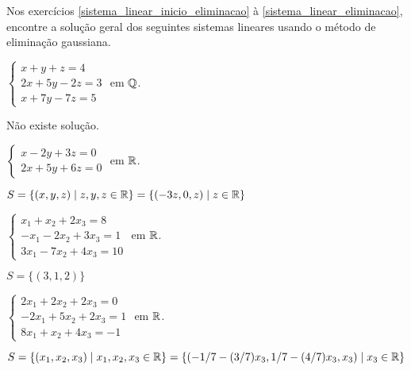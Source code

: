 \documentclass[12pt]{exam}
\begin{document}
Nos exercícios \ref{sistema_linear_inicio_eliminacao} à \ref{sistema_linear_eliminacao}, encontre a solução geral dos seguintes sistemas lineares usando o método de eliminação gaussiana.
\begin{exercicio}\label{sistema_linear_inicio_eliminacao}
    $
        \begin{cases}
            x + y + z = 4\\
            2x + 5y - 2z = 3\\
            x + 7y - 7z = 5
        \end{cases}
    $
    em $\mathbb{Q}$.
  \begin{solucao}
    Não existe solução.
  \end{solucao}
\end{exercicio}

\begin{exercicio}
    $
        \begin{cases}
            x - 2y + 3z = 0\\
            2x + 5y + 6z = 0
        \end{cases}
      $
      em $\mathbb{R}$.
    \begin{solucao}
        $S = \{(x, y, z) \mid z, y, z \in \mathbb{R}\} = \{(-3z, 0, z) \mid z \in \mathbb{R}\}$
    \end{solucao}
\end{exercicio}

\begin{exercicio}
    $
        \begin{cases}
            x_1 + x_2 + 2x_3 = 8\\
            -x_1 - 2x_2 + 3x_3 = 1\\
            3x_1 - 7x_2 + 4x_3 = 10
        \end{cases}
    $
    em $\mathbb{R}$.
    \begin{solucao}
        $S = \{(3, 1, 2)\}$
    \end{solucao}
\end{exercicio}

\begin{exercicio}
    $
        \begin{cases}
            2x_1 + 2x_2 + 2x_3 = 0\\
            -2x_1 + 5x_2 + 2x_3 = 1\\
            8x_1 + x_2 + 4x_3 = -1
        \end{cases}
    $
    em $\mathbb{R}$.
    \begin{solucao}
        $S = \{(x_1, x_2, x_3) \mid x_1, x_2, x_3 \in \mathbb{R}\} = \{(-1/7 - (3/7)x_3, 1/7 - (4/7)x_3, x_3) \mid x_3 \in \mathbb{R}\}$
    \end{solucao}
\end{exercicio}
\end{document}
